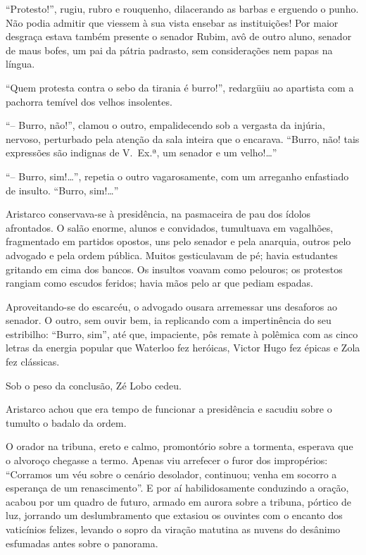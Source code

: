 ``Protesto!'', rugiu, rubro e rouquenho, dilacerando
as barbas e erguendo o punho. Não podia admitir que viessem à sua vista
ensebar as instituições! Por maior desgraça estava também presente o
senador Rubim, avô de outro aluno, senador de maus bofes, um pai da
pátria padrasto, sem considerações nem papas na língua. 

``Quem protesta contra o sebo da tirania é burro!'', redargüiu ao apartista com a
pachorra temível dos velhos insolentes. 

``-- Burro, não!'', clamou o
outro, empalidecendo sob a vergasta da injúria, nervoso, perturbado
pela atenção da sala inteira que o encarava. ``Burro, não! tais
expressões são indignas de V.~Ex.ª, um senador e um velho!\ldots'' 

``-- Burro, sim!\ldots'', repetia o outro vagarosamente, com um arreganho
enfastiado de insulto. ``Burro, sim!\ldots''

Aristarco conservava{}-se à
presidência, na pasmaceira de pau dos ídolos afrontados. O salão
enorme, alunos e convidados, tumultuava em vagalhões, fragmentado em
partidos opostos, uns pelo senador e pela anarquia, outros pelo
advogado e pela ordem pública. Muitos gesticulavam de pé; havia
estudantes gritando em cima dos bancos. Os insultos voavam como
pelouros; os protestos rangiam como escudos feridos; havia mãos pelo ar
que pediam espadas. 

Aproveitando{}-se do escarcéu, o advogado ousara
arremessar uns desaforos ao senador. O outro, sem ouvir bem, ia
replicando com a impertinência do seu estribilho: ``Burro, sim'', até
que, impaciente, pôs remate à polêmica com as cinco letras da energia
popular que Waterloo fez heróicas, Victor Hugo fez épicas e Zola fez
clássicas. 

Sob o peso da conclusão, Zé Lobo cedeu. 

Aristarco achou que
era tempo de funcionar a presidência e sacudiu sobre o tumulto o badalo
da ordem. 

O orador na tribuna, ereto e calmo, promontório sobre a
tormenta, esperava que o alvoroço chegasse a termo. Apenas viu
arrefecer o furor dos impropérios: ``Corramos um véu sobre o cenário
desolador, continuou; venha em socorro a esperança de um renascimento''.
E por aí habilidosamente conduzindo a oração, acabou por um quadro de
futuro, armado em aurora sobre a tribuna, pórtico de luz, jorrando um
deslumbramento que extasiou os ouvintes com o encanto dos vaticínios
felizes, levando o sopro da viração matutina as nuvens do desânimo
esfumadas antes sobre o panorama. 

